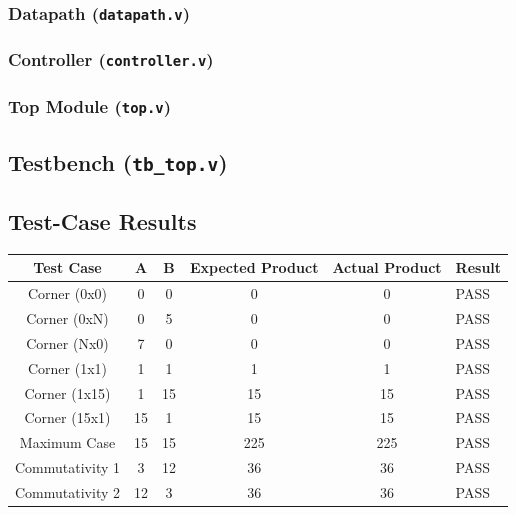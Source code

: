 \documentclass[12pt,a4paper]{article}
\begin{document}
\subsubsection{Datapath (\texttt{datapath.v})}


\subsubsection{Controller (\texttt{controller.v})}


\subsubsection{Top Module (\texttt{top.v})}


\subsection{Testbench (\texttt{tb\_top.v})}


\subsection{Test-Case Results}
\begin{table}[H]
\centering
\begin{tabular}{|c|c|c|c|c|l|}
\hline
\textbf{Test Case} & \textbf{A} & \textbf{B} & \textbf{Expected Product} & \textbf{Actual Product} & \textbf{Result} \\ \hline
Corner (0x0) & 0 & 0 & 0 & 0 & PASS \\ \hline
Corner (0xN) & 0 & 5 & 0 & 0 & PASS \\ \hline
Corner (Nx0) & 7 & 0 & 0 & 0 & PASS \\ \hline
Corner (1x1) & 1 & 1 & 1 & 1 & PASS \\ \hline
Corner (1x15) & 1 & 15 & 15 & 15 & PASS \\ \hline
Corner (15x1) & 15 & 1 & 15 & 15 & PASS \\ \hline
Maximum Case & 15 & 15 & 225 & 225 & PASS \\ \hline
Commutativity 1 & 3 & 12 & 36 & 36 & PASS \\ \hline
Commutativity 2 & 12 & 3 & 36 & 36 & PASS \\ \hline
\end{tabular}
\end{table}
\end{document}
